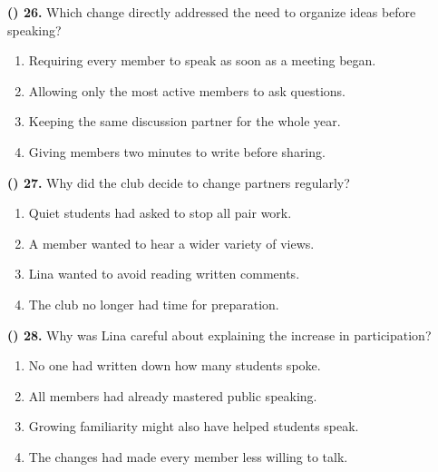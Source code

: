\documentclass[11pt,a4paper]{article}
\newenvironment{qblock}{\par\vspace{3pt}\noindent\begin{minipage}{\linewidth}}{\end{minipage}\par\vspace{4pt}}
\begin{document}
\begin{qblock}
\textbf{(\hspace{0.6cm}) 26.} Which change directly addressed the need to organize ideas before speaking?
\par
\begin{enumerate}[label=(\Alph*),leftmargin=1.0cm,nosep,topsep=2pt]
\item Requiring every member to speak as soon as a meeting began.
\item Allowing only the most active members to ask questions.
\item Keeping the same discussion partner for the whole year.
\item Giving members two minutes to write before sharing.
\end{enumerate}
\end{qblock}
\begin{qblock}
\textbf{(\hspace{0.6cm}) 27.} Why did the club decide to change partners regularly?
\par
\begin{enumerate}[label=(\Alph*),leftmargin=1.0cm,nosep,topsep=2pt]
\item Quiet students had asked to stop all pair work.
\item A member wanted to hear a wider variety of views.
\item Lina wanted to avoid reading written comments.
\item The club no longer had time for preparation.
\end{enumerate}
\end{qblock}
\begin{qblock}
\textbf{(\hspace{0.6cm}) 28.} Why was Lina careful about explaining the increase in participation?
\par
\begin{enumerate}[label=(\Alph*),leftmargin=1.0cm,nosep,topsep=2pt]
\item No one had written down how many students spoke.
\item All members had already mastered public speaking.
\item Growing familiarity might also have helped students speak.
\item The changes had made every member less willing to talk.
\end{enumerate}
\end{qblock}
\end{document}

